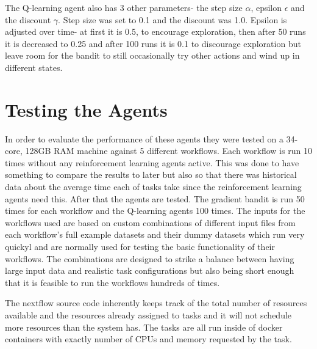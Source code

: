 The Q-learning agent also has 3 other parameters- the step size $\alpha$, epsilon $\epsilon$ and the discount $\gamma$. Step size was set to 0.1 and the discount was 1.0. Epsilon is adjusted over time- at first it is 0.5, to encourage exploration, then after 50 runs it is decreased to 0.25 and after 100 runs it is 0.1 to discourage exploration but leave room for the bandit to still occasionally try other actions and wind up in different states.

\section{Testing the Agents}
\label{sec:testing}

In order to evaluate the performance of these agents they were tested on a 34-core, 128GB RAM machine against 5 different workflows. Each workflow is run 10 times without any reinforcement learning agents active. This was done to have something to compare the results to later but also so that there was historical data about the average time each of tasks take since the reinforcement learning agents need this. After that the agents are tested. The gradient bandit is run 50 times for each workflow and the Q-learning agents 100 times. The inputs for the workflows used are based on custom combinations of different input files from each workflow’s full example datasets and their dummy datasets which run very quickyl and are normally used for testing the basic functionality of their workflows. The combinations are designed to strike a balance between having large input data and realistic task configurations but also being short enough that it is feasible to run the workflows hundreds of times. 

The nextflow source code inherently keeps track of the total number of resources available and the resources already assigned to tasks and it will not schedule more resources than the system has. The tasks are all run inside of docker containers with exactly number of CPUs and memory requested by the task. 




